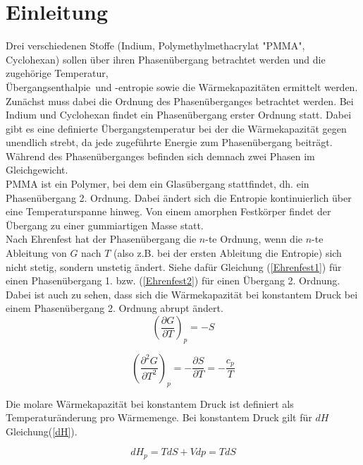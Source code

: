 \documentclass[12pt,a4paper,titlepage,headinclude,bibtotoc]{scrartcl}
\begin{document}
\section{Einleitung}
Drei verschiedenen Stoffe (Indium, Polymethylmethacrylat "PMMA", Cyclohexan) sollen über ihren Phasenübergang betrachtet werden und die zugehörige Temperatur,\\ Übergangsenthalpie\, und -entropie sowie die Wärmekapazitäten ermittelt werden.\\
Zunächst muss dabei die Ordnung des Phasenüberganges betrachtet werden. Bei Indium und Cyclohexan findet ein Phasenübergang erster Ordnung statt. Dabei gibt es eine definierte Übergangstemperatur bei der die Wärmekapazität gegen unendlich strebt, da jede zugeführte Energie zum Phasenübergang beiträgt. Während des Phasenüberganges befinden sich demnach zwei Phasen im Gleichgewicht.\\
PMMA ist ein Polymer, bei dem ein Glasübergang stattfindet, dh. ein Phasenübergang 2. Ordnung. Dabei ändert sich die Entropie kontinuierlich über eine Temperaturspanne hinweg. Von einem amorphen Festkörper findet der Übergang zu einer gummiartigen Masse statt.\\ 
Nach Ehrenfest hat der Phasenübergang die $n$-te Ordnung, wenn die $n$-te Ableitung von $G$ nach $T$ (also z.B. bei der ersten Ableitung die Entropie) sich nicht stetig, sondern unstetig ändert. Siehe dafür Gleichung (\ref{Ehrenfest1}) für einen Phasenübergang 1. bzw. (\ref{Ehrenfest2}) für einen Übergang 2. Ordnung. Dabei ist auch zu sehen, dass sich die Wärmekapazität bei konstantem Druck  bei einem Phasenübergang 2. Ordnung abrupt ändert.\\ 


\begin{equation} \label{Ehrenfest1}
\left(\frac{\partial G}{\partial T}\right)_p = -S
\end{equation}  
  
\begin{equation} \label{Ehrenfest2}
\left(\frac{\partial^2 G}{\partial T^2}\right)_p = -\frac{\partial S}{\partial T}= - \frac{c_p}{T}
\end{equation}  


Die molare Wärmekapazität bei konstantem Druck ist definiert als Temperaturänderung pro Wärmemenge. Bei konstantem Druck gilt für $dH$ Gleichung(\ref{dH}). 

\begin{equation} \label{dH}
dH_p= TdS +Vdp =TdS
\end{equation}
\end{document}
